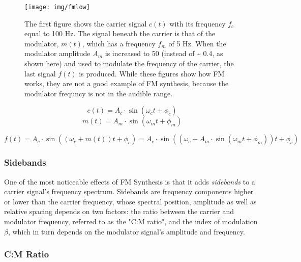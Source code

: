 \pagebreak

\begin{figure}[]
  \texttt{[image: img/fmlow]}
  \caption{The first figure shows the carrier signal $c(t)$ with its frequency $f_{c}$ equal to 100 Hz. The signal beneath the carrier is that of the modulator, $m(t)$, which has a frequency $f_{m}$ of 5 Hz. When the modulator amplitude $A_{m}$ is increased to 50 (instead of \textasciitilde{} 0.4, as shown here) and used to modulate the frequency of the carrier, the last signal $f(t)$ is produced. While these figures show how FM works, they are not a good example of FM synthesis, because the modulator frequncy is not in the audible range.}
  \label{fig:fmlow}
\end{figure}

\begin{multicols}{2}
  \begin{equation}
    c(t) = A_{c} \cdot \sin(\omega_{c}t + \phi_{c})
    \end{equation}\break
    \begin{equation}
      m(t) = A_{m} \cdot \sin(\omega_{m}t + \phi_{m})
    \end{equation}
  \end{multicols}

  \begin{equation}
    f(t) = A_{c} \cdot \sin((\omega_{c} + m(t))t + \phi_{c}) = A_{c} \cdot \sin((\omega_{c} + A_{m} \cdot \sin(\omega_{m}t + \phi_{m}))t + \phi_{c})
    \label{eq:fm}
  \end{equation}

  \subsubsection{Sidebands}

  One of the most noticeable effects of FM Synthesis is that it adds \emph{sidebands} to a carrier signal's frequency spectrum. Sidebands are frequency components higher or lower than the carrier frequency, whose spectral position, amplitude as well as relative spacing depends on two factors: the ratio between the carrier and modulator frequency, referred to as the "C:M ratio", and the index of modulation $\beta$, which in turn depends on the modulator signal's amplitude and frequency.

  \subsubsection{C:M Ratio}


